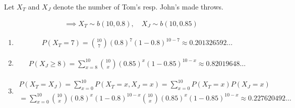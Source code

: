 \begin{solution}

Let $X_T$ and $X_J$ denote the number of Tom's resp. John's made throws.

\begin{align*}
    \implies
    X_T \sim b(10, 0.8),
    \quad
    X_J \sim b(10, 0.85)
\end{align*}

\begin{enumerate}[label = (\alph*)]

    \item 

    \begin{align*}
        P(X_T = 7)
        =
        \binom{10}{7} (0.8)^7 (1 - 0.8)^{10 - 7}
        \approx
        0.201326592 \dots
    \end{align*}

    \item 

    \begin{align*}
        P(X_J \geq 8)
        =
        \sum_{x=8}^{10}
            \binom{10}{x} (0.85)^x (1 - 0.85)^{10 - x}
        \approx
        0.82019648 \dots
    \end{align*}

    \item 

    \begin{multline*}
        P(X_T = X_J)
        =
        \sum_{x=0}^{10}
            P(X_T = x, X_J = x)
        =
        \sum_{x=0}^{10}
            P(X_T = x) P(X_J = x) \\
        =
        \sum_{x=0}^{10}
            \binom{10}{x} (0.8)^x (1 - 0.8)^{10 - x}
            \binom{10}{x} (0.85)^x (1 - 0.85)^{10 - x}
        \approx
        0.227620492 \dots
    \end{multline*}

\end{enumerate}

\end{solution}

